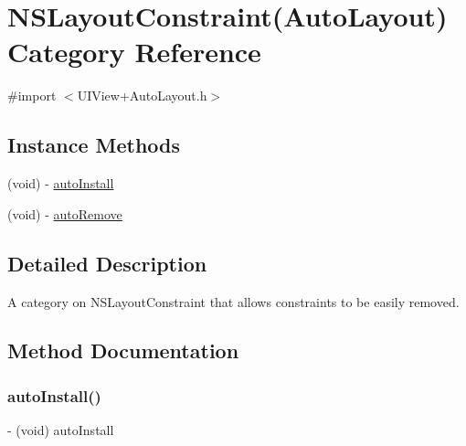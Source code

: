 \hypertarget{category_n_s_layout_constraint_07_auto_layout_08}{}\section{N\+S\+Layout\+Constraint(Auto\+Layout) Category Reference}
\label{category_n_s_layout_constraint_07_auto_layout_08}


{\ttfamily \#import $<$U\+I\+View+\+Auto\+Layout.\+h$>$}

\subsection*{Instance Methods}
\begin{DoxyCompactItemize}
\item 
(void) -\/ \mbox{\hyperlink{category_n_s_layout_constraint_07_auto_layout_08_a9568f504b0624b0371aa7e67ddf5c896}{auto\+Install}}
\item 
(void) -\/ \mbox{\hyperlink{category_n_s_layout_constraint_07_auto_layout_08_a454e71cfa38480a628b2876d93bdad9a}{auto\+Remove}}
\end{DoxyCompactItemize}


\subsection{Detailed Description}
A category on N\+S\+Layout\+Constraint that allows constraints to be easily removed. 

\subsection{Method Documentation}
\mbox{\label{category_n_s_layout_constraint_07_auto_layout_08_a9568f504b0624b0371aa7e67ddf5c896}} 
\subsubsection{\texorpdfstring{auto\+Install()}{autoInstall()}}
{\footnotesize\ttfamily -\/ (void) auto\+Install \begin{DoxyParamCaption}{ }\end{DoxyParamCaption}}

